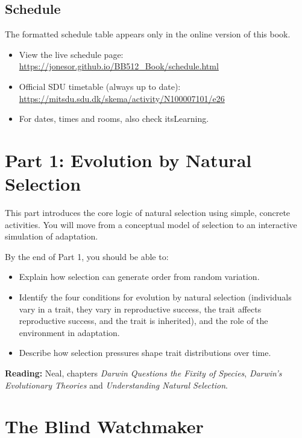 \documentclass[
  a4paper]{book}
\providecommand{\tightlist}{%
  \setlength{\itemsep}{0pt}\setlength{\parskip}{0pt}}
\begin{document}
\section{Schedule}\label{schedule}

The formatted schedule table appears only in the online version of this book.

\begin{itemize}
\tightlist
\item
  View the live schedule page: \url{https://jonesor.github.io/BB512_Book/schedule.html}
\item
  Official SDU timetable (always up to date): \url{https://mitsdu.sdu.dk/skema/activity/N100007101/e26}
\item
  For dates, times and rooms, also check itsLearning.
\end{itemize}

\chapter*{Part 1: Evolution by Natural Selection}\label{part-1}

This part introduces the core logic of natural selection using simple, concrete activities. You will move from a conceptual model of selection to an interactive simulation of adaptation.

By the end of Part 1, you should be able to:

\begin{itemize}
\tightlist
\item
  Explain how selection can generate order from random variation.
\item
  Identify the four conditions for evolution by natural selection (individuals vary in a trait, they vary in reproductive success, the trait affects reproductive success, and the trait is inherited), and the role of the environment in adaptation.
\item
  Describe how selection pressures shape trait distributions over time.
\end{itemize}

\textbf{Reading:} Neal, chapters \emph{Darwin Questions the Fixity of Species}, \emph{Darwin's Evolutionary Theories} and \emph{Understanding Natural Selection}.

\chapter{The Blind Watchmaker}\label{the-blind-watchmaker}
\end{document}
